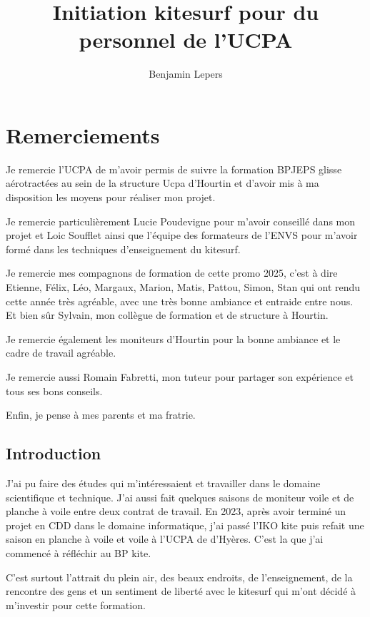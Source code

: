\documentclass[11pt,a4paper]{report}
\begin{document}
\author{Benjamin Lepers}
\title{Initiation kitesurf pour du personnel de l'UCPA}
\maketitle
\chapter*{Remerciements}
Je remercie l'UCPA de m'avoir permis de suivre la formation
BPJEPS glisse aérotractées au sein de la structure Ucpa 
d'Hourtin et d'avoir
mis à ma disposition les moyens pour réaliser mon projet.
 
Je remercie particulièrement Lucie Poudevigne pour m'avoir
conseillé  dans mon projet et Loic Soufflet ainsi que 
l'équipe des formateurs de l'ENVS pour m'avoir formé 
dans les techniques d'enseignement du kitesurf.

Je remercie mes compagnons de formation de cette promo 2025,
c'est à dire Etienne, Félix, Léo, Margaux, Marion, Matis, Pattou,
Simon, Stan qui ont rendu cette année très agréable,
avec une très bonne ambiance et entraide entre nous.
Et bien s\^ur Sylvain, mon collègue de formation et 
de structure à Hourtin.

Je remercie également les moniteurs d'Hourtin  pour la
bonne ambiance et le cadre de travail agréable.

Je remercie aussi Romain Fabretti, mon tuteur pour
partager son expérience et tous ses bons conseils.

Enfin, je pense à  mes parents et ma fratrie.


\tableofcontents
\newpage
\section{Introduction}
J'ai pu faire des études qui m'intéressaient et travailler dans
le domaine scientifique et technique. J'ai aussi fait quelques 
saisons de moniteur voile et de planche à voile entre deux contrat 
de travail.
En 2023, après avoir terminé un projet
en CDD dans le domaine informatique, j'ai passé l'IKO kite\cite{iko}
puis refait une saison en planche à voile et voile à l'UCPA de 
d'Hyères. C'est la que j'ai commencé à réfléchir au BP kite.

C'est surtout l'attrait du plein air, des beaux endroits,
de l'enseignement, de la rencontre
des gens et un sentiment de liberté avec le kitesurf qui 
m'ont décidé à m'investir pour cette formation.
\end{document}

